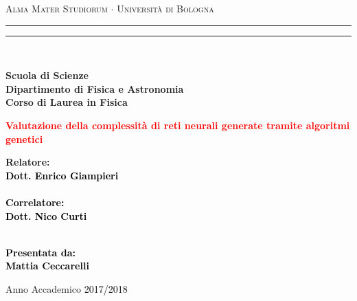 \documentclass[12pt,a4paper]{report}
\begin{document}
\begin{titlepage}

%
%
%
%
\begin{center}
{{\Large{\textsc{Alma Mater Studiorum $\cdot$ Universit\`a di Bologna}}}} 
\rule[0.1cm]{15.8cm}{0.1mm}
\rule[0.5cm]{15.8cm}{0.6mm}
\\\vspace{3mm}

{\small{\bf Scuola di Scienze \\ 
Dipartimento di Fisica e Astronomia\\
Corso di Laurea in Fisica}}

\end{center}

\vspace{23mm}

\begin{center}\textcolor{red}{
%
%
{\LARGE{\bf Valutazione della complessità di reti neurali generate tramite algoritmi genetici}}\\
}\end{center}

\vspace{50mm} \par \noindent

\begin{minipage}[t]{0.47\textwidth}
%
%
{\large{\bf Relatore: \vspace{2mm}\\\textcolor{black}{
Dott. Enrico Giampieri}\\\\
%
%
%
\textcolor{black}{
\bf Correlatore: 
\vspace{2mm}\\
Dott. Nico Curti\\\\}}}
\end{minipage}
%
\hfill
%
\begin{minipage}[t]{0.47\textwidth}\raggedleft \textcolor{black}{
{\large{\bf Presentata da:
\vspace{2mm}\\
%
%
Mattia Ceccarelli}}}
\end{minipage}

\vspace{38mm} %

\begin{center}
%
%
Anno Accademico \textcolor{black}{ 2017/2018}
\end{center}

\end{titlepage}
\end{document}
